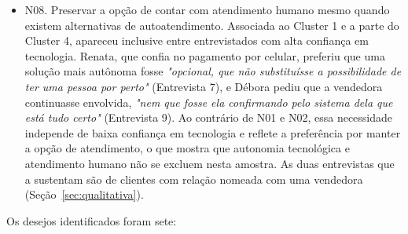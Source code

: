 \begin{itemize}
    \item N08. Preservar a opção de contar com atendimento humano mesmo quando existem alternativas de autoatendimento. Associada ao Cluster 1 e a parte do Cluster 4, apareceu inclusive entre entrevistados com alta confiança em tecnologia. Renata, que confia no pagamento por celular, preferiu que uma solução mais autônoma fosse \emph{"opcional, que não substituísse a possibilidade de ter uma pessoa por perto"} (Entrevista 7), e Débora pediu que a vendedora continuasse envolvida, \emph{"nem que fosse ela confirmando pelo sistema dela que está tudo certo"} (Entrevista 9). Ao contrário de N01 e N02, essa necessidade independe de baixa confiança em tecnologia e reflete a preferência por manter a opção de atendimento, o que mostra que autonomia tecnológica e atendimento humano não se excluem nesta amostra. As duas entrevistas que a sustentam são de clientes com relação nomeada com uma vendedora (Seção~\ref{sec:qualitativa}).
\end{itemize}

Os desejos identificados foram sete:


